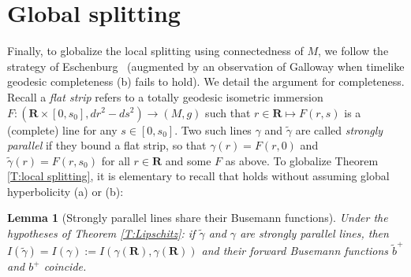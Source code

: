 \documentclass[12pt]{amsart}
\newcommand{\R}{{\mathbf R}}
\newtheorem{lemma}[theorem]{Lemma}
\begin{document}
\section{Global splitting}

Finally, to globalize the local splitting using connectedness of $M$,  we follow the strategy of 
Eschenburg~\cite{Eschenburg88} (augmented by an observation of Galloway \cite{Galloway89} when {timelike geodesic completeness} (b) fails to hold). We detail the argument for completeness.
Recall a {\em flat strip} refers to a totally geodesic isometric immersion 
$F:(\R \times [0,s_0], dr^2 - ds^2) \longrightarrow (M,g)$ such that $r \in \R \mapsto F(r,s)$ is a (complete) line for any $s \in [0,s_0]$.
Two  such lines $\gamma$ and $\tilde \gamma$ are called {\em strongly parallel} if they bound a flat strip, so that $\gamma(r) =F(r,0)$
and $\tilde \gamma(r) =F(r,s_0)$ for all $r \in \R$ and some $F$ as above. 
To globalize Theorem \ref{T:local splitting},  it is elementary to recall that \cite[Lemma 7.2]{Eschenburg88} 
holds without assuming {global hyperbolicity} (a) or (b):

\begin{lemma}[Strongly parallel lines share their Busemann functions]\label{L:parallel}
Under the hypotheses of Theorem \ref{T:Lipschitz}: 
if $\tilde \gamma$ and $\gamma$ are strongly parallel lines,  then $I(\tilde \gamma)=I(\gamma):=I(\gamma(\R),\gamma(\R))$ 
and their forward Busemann functions $\tilde b^+$ and $b^+$ coincide.
\end{lemma}
\end{document}
